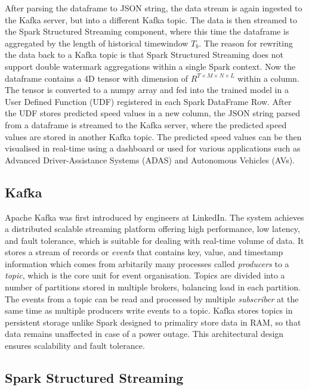 \documentclass[11pt]{uonthesis}
\begin{document}
After parsing the dataframe to JSON string, the data stream is again ingested to the Kafka server, but into a different Kafka topic. The data is then streamed to the Spark Structured Streaming component, where this time the dataframe is aggregated by the length of historical timewindow $T_b$. The reason for rewriting the data back to a Kafka topic is that Spark Structured Streaming does not support double watermark aggregations within a single Spark context. Now the dataframe contains a 4D tensor with dimension of $R^{T{\times}M{\times}N{\times}L}$ within a column. The tensor is converted to a numpy array and fed into the trained model in a User Defined Function (UDF) registered in each Spark DataFrame Row. After the UDF stores predicted speed values in a new column, the JSON string parsed from a dataframe is streamed to the Kafka server, where the predicted speed values are stored in another Kafka topic. The predicted speed values can be then visualised in real-time using a dashboard or used for various applications such as Advanced Driver-Assistance Systems (ADAS) and Autonomous Vehicles (AVs). 

\subsection{Kafka}

Apache Kafka\cite{Kreps2011KafkaA} was first introduced by engineers at LinkedIn. The system achieves a distributed scalable streaming platform offering high performance, low latency, and fault tolerance, which is suitable for dealing with real-time volume of data. It stores a stream of records or \textit{events} that contains key, value, and timestamp information which comes from arbitarily many processes called \textit{producers} to a \textit{topic}, which is the core unit for event organisation. Topics are divided into a number of partitions stored in multiple brokers, balancing load in each partition. The events from a topic can be read and processed by multiple \textit{subscriber} at the same time as multiple producers write events to a topic. Kafka stores topics in persistent storage unlike Spark designed to primaliry store data in RAM, so that data remains unaffected in case of a power outage. This architectural design ensures scalability and fault tolerance. 

\subsection{Spark Structured Streaming}
\end{document}
